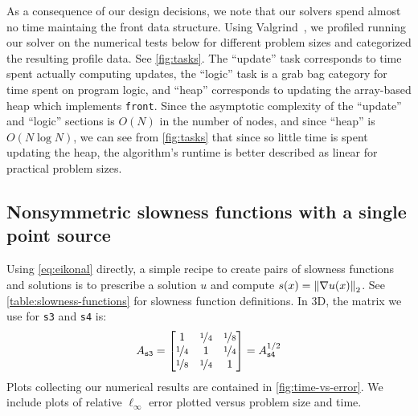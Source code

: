 \documentclass[sisc-eikonal.tex]{subfiles}
\begin{document}
As a consequence of our design decisions, we note that our solvers
spend almost no time maintaing the front data structure. Using
Valgrind~\cite{nethercote2007valgrind}, we profiled running our solver
on the numerical tests below for different problem sizes and
categorized the resulting profile data. See \cref{fig:tasks}. The
``update'' task corresponds to time spent actually computing updates,
the ``logic'' task is a grab bag category for time spent on program
logic, and ``heap'' corresponds to updating the array-based heap which
implements \texttt{front}. Since the asymptotic complexity of the
``update'' and ``logic'' sections is $O(N)$ in the number of nodes,
and since ``heap'' is $O(N \log N)$, we can see from \cref{fig:tasks}
that since so little time is spent updating the heap, the algorithm's
runtime is better described as linear for practical problem sizes.

\subsection[Single point source]{Nonsymmetric slowness functions with
  a single point source}\label{ssec:point-source-problems}

Using \cref{eq:eikonal} directly, a simple recipe to create pairs of
slowness functions and solutions is to prescribe a solution $u$ and
compute $s(x) = \left\|\nabla u(x)\right\|_2$. See
\cref{table:slowness-functions} for slowness function definitions. In
3D, the matrix we use for \texttt{s3} and \texttt{s4}
is:\begin{equation}
  A_{\texttt{s3}} = \begin{bmatrix}
    1 & \nicefrac{1}{4} & \nicefrac{1}{8} \\
    \nicefrac{1}{4} & 1 & \nicefrac{1}{4} \\
    \nicefrac{1}{8} & \nicefrac{1}{4} & 1
  \end{bmatrix} = A_{\texttt{s4}}^{1/2}
\end{equation}
Plots collecting our numerical results are contained in
\cref{fig:time-vs-error}. We include plots of relative
$\ell_\infty$ error plotted versus problem size and
time.
\end{document}
